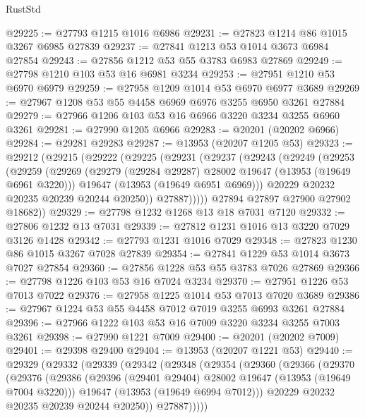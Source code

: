\begin{lexlean}{RustStd}
\begin{coremodule}
@29225 := @27793 @1215 @1016 @6986
@29231 := @27823 @1214 @86 @1015 @3267 @6985 @27839
@29237 := @27841 @1213 @53 @1014 @3673 @6984 @27854
@29243 := @27856 @1212 @53 @55 @3783 @6983 @27869
@29249 := @27798 @1210 @103 @53 @16 @6981 @3234
@29253 := @27951 @1210 @53 @6970 @6979
@29259 := @27958 @1209 @1014 @53 @6970 @6977 @3689
@29269 := @27967 @1208 @53 @55 @4458 @6969 @6976 @3255 @6950 @3261 @27884
@29279 := @27966 @1206 @103 @53 @16 @6966 @3220 @3234 @3255 @6960 @3261
@29281 := @27990 @1205 @6966
@29283 := @20201 (@20202 @6966)
@29284 := @29281 @29283
@29287 := @13953 (@20207 @1205 @53)
@29323 := @29212
    (@29215
      (@29222
        (@29225
          (@29231
            (@29237
              (@29243
                (@29249
                  (@29253
                    (@29259
                      (@29269
                        (@29279 (@29284 @29287) @28002 @19647 (@13953 (@19649 @6961 @3220)))
                        @19647
                        (@13953 (@19649 @6951 @6969)))
                      @20229
                      @20232
                      @20235
                      @20239
                      @20244
                      @20250))
                  @27887)))))
        @27894
        @27897
        @27900
        @27902
        @18682))
@29329 := @27798 @1232 @1268 @13 @18 @7031 @7120
@29332 := @27806 @1232 @13 @7031
@29339 := @27812 @1231 @1016 @13 @3220 @7029 @3126 @1428
@29342 := @27793 @1231 @1016 @7029
@29348 := @27823 @1230 @86 @1015 @3267 @7028 @27839
@29354 := @27841 @1229 @53 @1014 @3673 @7027 @27854
@29360 := @27856 @1228 @53 @55 @3783 @7026 @27869
@29366 := @27798 @1226 @103 @53 @16 @7024 @3234
@29370 := @27951 @1226 @53 @7013 @7022
@29376 := @27958 @1225 @1014 @53 @7013 @7020 @3689
@29386 := @27967 @1224 @53 @55 @4458 @7012 @7019 @3255 @6993 @3261 @27884
@29396 := @27966 @1222 @103 @53 @16 @7009 @3220 @3234 @3255 @7003 @3261
@29398 := @27990 @1221 @7009
@29400 := @20201 (@20202 @7009)
@29401 := @29398 @29400
@29404 := @13953 (@20207 @1221 @53)
@29440 := @29329
    (@29332
      (@29339
        (@29342
          (@29348
            (@29354
              (@29360
                (@29366
                  (@29370
                    (@29376
                      (@29386
                        (@29396 (@29401 @29404) @28002 @19647 (@13953 (@19649 @7004 @3220)))
                        @19647
                        (@13953 (@19649 @6994 @7012)))
                      @20229
                      @20232
                      @20235
                      @20239
                      @20244
                      @20250))
                  @27887)))))

\end{coremodule}
\end{lexlean}
